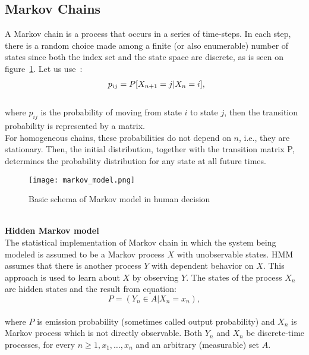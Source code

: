 \subsection{Markov Chains} \label{subsec:chain}
A Markov chain is a process that occurs in a series of time-steps.
In each step, there is a random choice made among a finite (or also enumerable) number of states since both  the index set and
the state space are discrete, as is seen on figure~\ref{markovmodel}.
Let us use~\cite{patel}:\\
\begin{equation} \label{eq:7}
\begin{array}{l@{}l}
	p_{ij}=P[X_{n+1}=j|X_n=i],
\end{array}
\end{equation}\\
where $p_{ij}$ is the probability of moving from state $i$ to state $j$, then the transition probability is represented by a matrix.\\
For homogeneous chains, these probabilities do not depend on $n$, i.e., they are stationary.
Then, the initial distribution, together with the transition matrix P, determines the probability distribution for any state at all future times.\\
\begin{figure}[h!]
	\begin{center}
		\texttt{[image: markov\_model.png]}
	\end{center}
	\caption{Basic schema of Markov model in human decision~\cite{patel}}
	\label{markovmodel}
\end{figure}\\
\textbf{Hidden Markov model} \label{subsec:hmm}\\
The statistical implementation of Markov chain in which the system being modeled is assumed to be a Markov process $X$ with unobservable states.
HMM assumes that there is another process $Y$ with dependent behavior on $X$.
This approach is used to learn about $X$ by observing $Y$.
The states of the process $X_n$ are hidden states and the result from equation:\\
\begin{equation} \label{eq:8}
P = (Y_n ∈ A|X_n = x_n),
\end{equation}\\
where $P$ is emission probability (sometimes called output probability) and $X_n$ is Markov process which is not directly observable.
Both $Y_n$ and $X_n$ be discrete-time processes, for every $n \geq 1, x_1,\ldots ,x_n$ and an arbitrary (measurable) set $A$.\\
